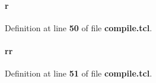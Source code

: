 \paragraph[{r}]{\setlength{\rightskip}{0pt plus 5cm}r}\label{tx__path__top_2pulse__gen_2compile_8tcl_a514f1b439f404f86f77090fa9edc96ce}


Definition at line {\bf 50} of file {\bf compile.\+tcl}.

\paragraph[{rr}]{\setlength{\rightskip}{0pt plus 5cm}rr}\label{tx__path__top_2pulse__gen_2compile_8tcl_aeb9279982226a42afdf2860dbdc29b45}


Definition at line {\bf 51} of file {\bf compile.\+tcl}.

